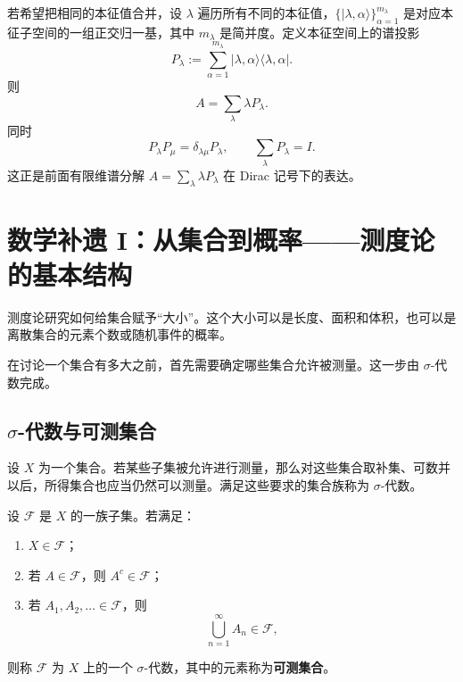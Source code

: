 \documentclass[UTF8,a4paper,11pt,openany]{ctexbook}
\begin{document}
若希望把相同的本征值合并，设 $\lambda$ 遍历所有不同的本征值，$\{|\lambda,\alpha\rangle\}_{\alpha=1}^{m_\lambda}$ 是对应本征子空间的一组正交归一基，其中 $m_\lambda$ 是简并度。定义本征空间上的谱投影
\begin{equation}
    P_\lambda
    :=
    \sum_{\alpha=1}^{m_\lambda}
    |\lambda,\alpha\rangle
    \langle\lambda,\alpha|.
\end{equation}
则
\begin{equation}
    \boxed{
    A
    =
    \sum_{\lambda}
    \lambda P_\lambda
    }.
\end{equation}
同时
\begin{equation}
    P_\lambda P_\mu
    =
    \delta_{\lambda\mu}P_\lambda,
    \qquad
    \sum_\lambda P_\lambda
    =
    I.
\end{equation}
这正是前面有限维谱分解
$A=\sum_\lambda\lambda P_\lambda$
在 Dirac 记号下的表达。

\appendix
\newpage
\chapter{数学补遗 I：从集合到概率——测度论的基本结构}

测度论研究如何给集合赋予“大小”。这个大小可以是长度、面积和体积，也可以是离散集合的元素个数或随机事件的概率。

在讨论一个集合有多大之前，首先需要确定哪些集合允许被测量。这一步由 $\sigma$-代数完成。

\section{$\sigma$-代数与可测集合}

设 $X$ 为一个集合。若某些子集被允许进行测量，那么对这些集合取补集、可数并以后，所得集合也应当仍然可以测量。满足这些要求的集合族称为 $\sigma$-代数。

\begin{definition}[$\sigma$-代数]
设 $\mathcal F$ 是 $X$ 的一族子集。若满足：
\begin{enumerate}
    \item $X\in\mathcal F$；
    \item 若 $A\in\mathcal F$，则 $A^c\in\mathcal F$；
    \item 若 $A_1,A_2,\ldots\in\mathcal F$，则
    \[
        \bigcup_{n=1}^{\infty}A_n\in\mathcal F,
    \]
\end{enumerate}
则称 $\mathcal F$ 为 $X$ 上的一个 $\sigma$-代数，其中的元素称为\textbf{可测集合}。
\end{definition}
\end{document}
